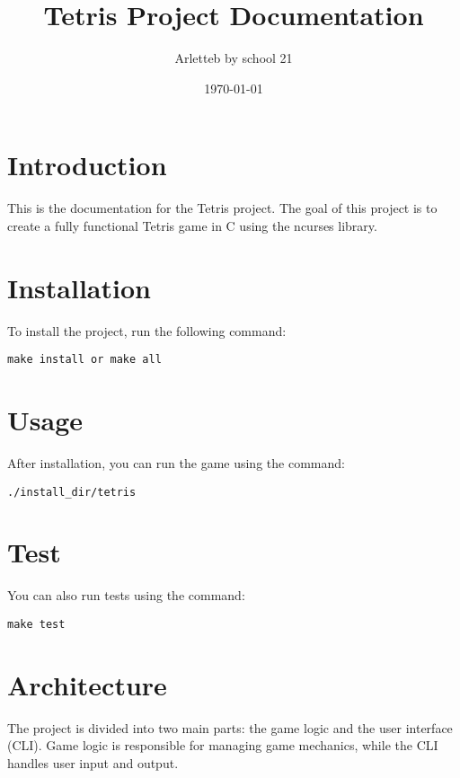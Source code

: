 \documentclass[a4paper,12pt]{article}
\begin{document}
\title{Tetris Project Documentation}
\author{Arletteb by school 21}
\date{\today}
\maketitle

\section{Introduction}
This is the documentation for the Tetris project. The goal of this project is to create a fully functional Tetris game in C using the ncurses library.

\section{Installation}
To install the project, run the following command:
\begin{verbatim}
make install or make all
\end{verbatim}

\section{Usage}
After installation, you can run the game using the command:
\begin{verbatim}
./install_dir/tetris
\end{verbatim}

\section{Test}
You can also run tests using the command:
\begin{verbatim}
make test
\end{verbatim}

\section{Architecture}
The project is divided into two main parts: the game logic and the user interface (CLI). Game logic is responsible for managing game mechanics, while the CLI handles user input and output.
\end{document}
